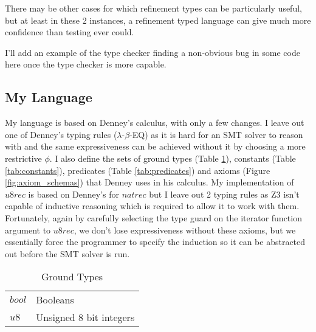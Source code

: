 There may be other cases for which refinement types can be particularly useful, but at least in
these 2 instances, a refinement typed language can give much more confidence than testing ever
could.

\begin{itshape}
    I'll add an example of the type checker finding a non-obvious bug in some code here once the
    type checker is more capable.
\end{itshape}

\subsection{My Language}

My language is based on Denney's calculus, with only a few changes.
I leave out one of Denney's typing rules ($\lambda$-$\beta$-EQ) as it is hard for an SMT solver to reason with and
the same expressiveness can be achieved without it by choosing a more restrictive $\phi$.
I also define the sets of ground types (Table \ref{tab:ground_types}), constants (Table \ref{tab:constants}),
predicates (Table \ref{tab:predicates}) and axioms (Figure \ref{fig:axiom_schemas}) that Denney uses in his
calculus.
My implementation of $u8rec$ is based on Denney's for $natrec$ but I leave out 2 typing rules as Z3 isn't
capable of inductive reasoning which is required to allow it to work with them.
Fortunately, again by carefully selecting the type guard on the iterator function argument to $u8rec$,
we don't lose expressiveness without these axioms, but we essentially force the programmer to specify the
induction so it can be abstracted out before the SMT solver is run.

\begin{table}
    \centering
    \begin{tabular}{|l|l|}
        \cline{1-2}
        $bool$ & Booleans\\\cline{1-2}
        $u8$ & Unsigned 8 bit integers\\\cline{1-2}
    \end{tabular}
    \caption{Ground Types}
    \label{tab:ground_types}
\end{table}

